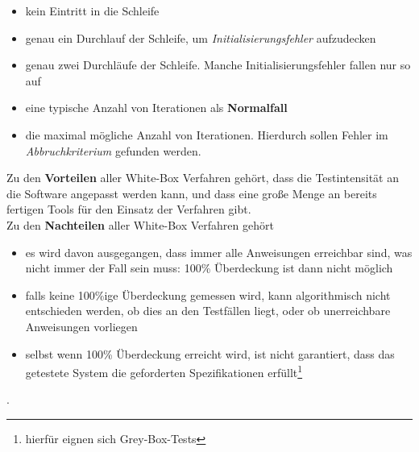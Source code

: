 \begin{itemize}
    \item kein Eintritt in die Schleife
    \item genau ein Durchlauf der Schleife, um \textit{Initialisierungsfehler} aufzudecken
    \item genau zwei Durchläufe der Schleife. Manche Initialisierungsfehler fallen nur so auf
    \item eine typische Anzahl von Iterationen als \textbf{Normalfall}
    \item die maximal mögliche Anzahl von Iterationen. Hierdurch sollen Fehler im \textit{Abbruchkriterium} gefunden werden.
\end{itemize}

\noindent
Zu den \textbf{Vorteilen} aller White-Box Verfahren gehört, dass die Testintensität an die Software angepasst werden kann, und dass eine große Menge an bereits fertigen Tools für den Einsatz der Verfahren gibt.\\
Zu den \textbf{Nachteilen} aller White-Box Verfahren gehört
\begin{itemize}
    \item es wird davon ausgegangen, dass immer alle Anweisungen erreichbar sind, was nicht immer der Fall sein muss: 100\% Überdeckung ist dann nicht möglich
    \item falls keine 100\%ige Überdeckung gemessen wird, kann algorithmisch nicht entschieden werden, ob dies an den Testfällen liegt, oder ob unerreichbare Anweisungen vorliegen
    \item selbst wenn 100\% Überdeckung erreicht wird, ist nicht garantiert, dass das getestete System die geforderten Spezifikationen erfüllt\footnote{hierfür eignen sich Grey-Box-Tests}
\end{itemize}.